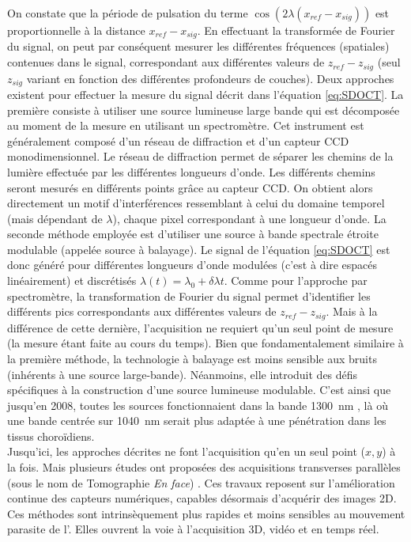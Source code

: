 On constate que la période de pulsation du terme $\cos(2\lambda(x_{ref}-x_{sig}))$ est proportionnelle à la distance $x_{ref}-x_{sig}$. En effectuant la transformée de Fourier du signal, on peut par conséquent mesurer les différentes fréquences (spatiales) contenues dans le signal, correspondant aux différentes valeurs de $z_{ref}-z_{sig}$ (seul $z_{sig}$ variant en fonction des différentes profondeurs de couches). Deux approches existent pour effectuer la mesure du signal décrit dans l'équation \ref{eq:SDOCT}. La première consiste à utiliser une source lumineuse large bande qui est décomposée au moment de la mesure en utilisant un spectromètre. Cet instrument est généralement composé d'un réseau de diffraction et d'un capteur CCD monodimensionnel. Le réseau de diffraction permet de séparer les chemins de la lumière effectuée par les différentes longueurs d'onde. Les différents chemins seront mesurés en différents points grâce au capteur CCD. On obtient alors directement un motif d'interférences ressemblant à celui du domaine temporel (mais dépendant de $\lambda$), chaque pixel correspondant à une longueur d'onde.
La seconde méthode employée est d'utiliser une source à bande spectrale étroite modulable (appelée source à balayage). Le signal de l'équation \ref{eq:SDOCT} est donc généré pour différentes longueurs d'onde modulées (c'est à dire espacés linéairement) et discrétisés $\lambda(t)=\lambda_0+\delta \lambda t$. Comme pour l'approche par spectromètre, la transformation de Fourier du signal permet d'identifier les différents  pics correspondants aux différentes valeurs de $z_{ref}-z_{sig}$. Mais à la différence de cette dernière, l'acquisition ne requiert qu'un seul point de mesure (la mesure étant faite au cours du temps). 
Bien que fondamentalement similaire à la première méthode, la technologie à balayage est moins sensible aux bruits (inhérents à une source large-bande). Néanmoins, elle introduit des défis spécifiques à la construction d'une source lumineuse modulable. C'est ainsi que jusqu'en 2008, toutes les sources fonctionnaient dans la bande \SI{1300}{\nano\meter} \cite{drexlerStateoftheartRetinalOptical2008}, là où une bande centrée sur \SI{1040}{\nano\meter} serait plus adaptée à une pénétration dans les tissus choroïdiens. 
\\
Jusqu'ici, les approches décrites ne font l'acquisition qu'en un seul point ($x, y$) à la fois. Mais plusieurs études ont proposées des acquisitions transverses parallèles (sous le nom de Tomographie \textit{En face}) \cite{duboisUltrahighresolutionFullfieldOptical2004, duboisHighresolutionFullfieldOptical2002, haugerInterferometerOpticalCoherence2003}. Ces travaux reposent sur l'amélioration continue des capteurs numériques, capables désormais d'acquérir des images 2D. Ces méthodes sont intrinsèquement plus rapides et moins sensibles au mouvement parasite de l'\oeil. Elles ouvrent la voie à l'acquisition 3D, vidéo et en temps réel.
